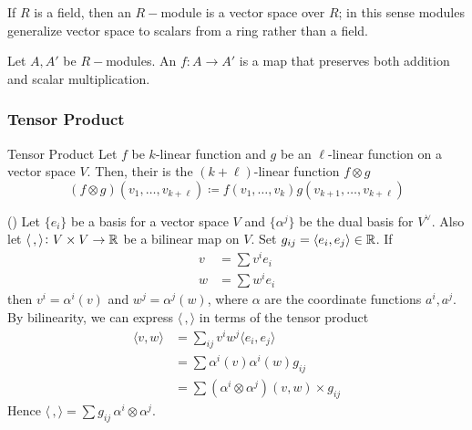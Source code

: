 If \(R\) is a field, then an \(R-\)module is a vector space over \(R\); in this sense modules generalize vector space to scalars from a ring rather than a field.

Let \(A, A'\) be \(R-\)modules. An  \(f\colon A \rightarrow A'\) is a map that preserves both addition and scalar multiplication.

\subsubsection{Tensor Product}

\begin{definition}{Tensor Product}{}
    Let \(f\) be \(k\)-linear function and \(g\) be an \(\ell\)-linear function on a vector space \(V\). Then, their  is the \((k+\ell)\)-linear function \(f\otimes g\)
    \begin{equation}
        (f \otimes g) (v_1, \dots, v_{k+\ell}) \coloneqq f(v_1, \dots, v_k)g(v_{k+1}, \dots, v_{k+\ell})
    \end{equation}
\end{definition}

\begin{example}{}{}
    () Let \(\{e_i\}\) be a basis for a vector space \(V\) and \(\{\alpha^j\}\) be the dual basis for \(V^\vee\). Also let \(\langle\,,\rangle\colon V \times V \rightarrow \mathbb{R}\) be a bilinear map on \(V\). Set \(g_{ij} = \langle e_i, e_j \rangle\in \mathbb{R}\). If
    \begin{align}
        v & = \sum v^i e_i \\
        w & = \sum w^i e_i
    \end{align}
    then \(v^i = \alpha^i(v)\) and \(w^j = \alpha^j(w)\), where \(\alpha\) are the coordinate functions \(a^i, a^j\). By bilinearity, we can express \(\langle\,,\rangle\) in terms of the tensor product
    \begin{equation}
        \begin{split}
            \langle v,w \rangle &= \sum_{ij} v^i w^j \langle e_i, e_j\rangle \\
            &= \sum \alpha^i(v) \alpha^i(w) g_{ij} \\
            &= \sum (\alpha^i \otimes \alpha^j)(v,w) \times g_{ij}
        \end{split}
    \end{equation}
    Hence \(\langle\,,\rangle = \sum g_{ij}\, \alpha^i \otimes \alpha^j\).
\end{example}

